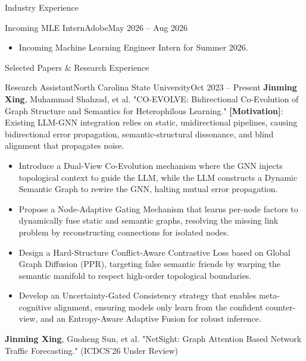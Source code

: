 \documentclass[]{mcdowellcv}
\begin{document}
\vspace*{-12pt}
\begin{cvsection}{Industry Experience}
    \begin{cvsubsection}{Incoming MLE Intern}{Adobe}{May 2026 -- Aug 2026}
        \begin{itemize}
            \item Incoming Machine Learning Engineer Intern for Summer 2026.
        \end{itemize}
    \end{cvsubsection}
\end{cvsection}
\vspace*{-12pt}
\begin{cvsection}{Selected Papers \& Research Experience}
    \begin{cvsubsection}{Research Assistant}{North Carolina State University}{Oct 2023 -- Present}
        \textbf{Jinming Xing}, Muhammad Shahzad, et al. "CO-EVOLVE: Bidirectional Co-Evolution of Graph Structure and Semantics for Heterophilous Learning."\newline
        \textbf{[Motivation]}: Existing LLM-GNN integration relies on static, unidirectional pipelines, causing bidirectional error propagation, semantic-structural dissonance, and blind alignment that propagates noise.
        \begin{itemize}
            \item Introduce a Dual-View Co-Evolution mechanism where the GNN injects topological context to guide the LLM, while the LLM constructs a Dynamic Semantic Graph to rewire the GNN, halting mutual error propagation.
            \item Propose a Node-Adaptive Gating Mechanism that learns per-node factors to dynamically fuse static and semantic graphs, resolving the missing link problem by reconstructing connections for isolated nodes.
            \item Design a Hard-Structure Conflict-Aware Contrastive Loss based on Global Graph Diffusion (PPR), targeting false semantic friends by warping the semantic manifold to respect high-order topological boundaries.
            \item Develop an Uncertainty-Gated Consistency strategy that enables meta-cognitive alignment, ensuring models only learn from the confident counter-view, and an Entropy-Aware Adaptive Fusion for robust inference.
        \end{itemize}
        \vspace{5pt}
        \textbf{Jinming Xing}, Guoheng Sun, et al. "NetSight: Graph Attention Based Network Traffic Forecasting." (ICDCS'26 Under Review)\newline

\end{cvsubsection}
\end{cvsection}
\end{document}
